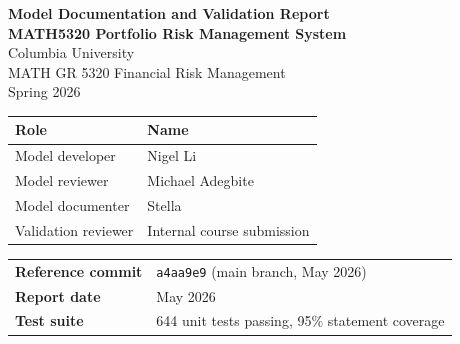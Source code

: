 \documentclass[11pt]{article}
\newcommand{\code}[1]{\texttt{#1}}
\begin{document}
\begin{titlepage}
\vspace*{2.5cm}
\begin{center}
{\LARGE\bfseries Model Documentation and Validation Report}\\[1.4em]
{\large\bfseries MATH5320 Portfolio Risk Management System}\\[3em]
{\large Columbia University\\[0.3em]
MATH GR 5320 Financial Risk Management\\[0.3em]
Spring 2026}\\[3.5em]

\begin{tabular}{@{}ll@{}}
\toprule
Role & Name \\
\midrule
Model developer & Nigel Li \\
Model reviewer & Michael Adegbite \\
Model documenter & Stella \\
Validation reviewer & Internal course submission \\
\bottomrule
\end{tabular}

\vspace{2.5em}
\begin{tabular}{@{}ll@{}}
\textbf{Reference commit} & \code{a4aa9e9} (main branch, May 2026) \\
\textbf{Report date}      & May 2026 \\
\textbf{Test suite}       & 644 unit tests passing, 95\% statement coverage \\
\end{tabular}
\end{center}
\end{titlepage}

\vspace*{0.5cm}
\noindent{}
\vspace{0.3cm}

\tableofcontents
\newpage
\end{document}
